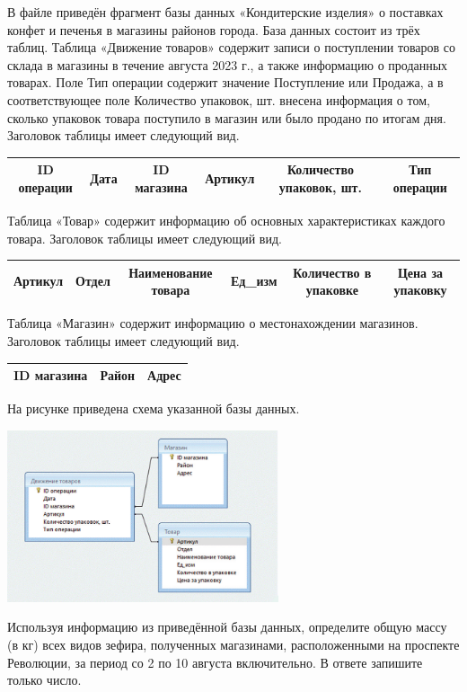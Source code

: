 \documentclass[14pt,a4paper]{article}
\begin{document}
В файле приведён фрагмент базы данных «Кондитерские изделия»
о поставках конфет и печенья в магазины районов города. База данных
состоит из трёх таблиц.
Таблица «Движение товаров» содержит записи о поступлении товаров
со склада в магазины в течение августа 2023 г., а также информацию
о проданных товарах. Поле Тип операции содержит значение Поступление
или Продажа, а в соответствующее поле Количество упаковок, шт. внесена
информация о том, сколько упаковок товара поступило в магазин или было
продано по итогам дня. Заголовок таблицы имеет следующий вид.

\begin{center}
    \begin{tabular}{|c|c|c|c|c|c|}
        \hline
        ID операции & Дата & ID магазина & Артикул & Количество упаковок, шт. & Тип операции \\
        \hline
    \end{tabular}
\end{center}

Таблица «Товар» содержит информацию об основных характеристиках
каждого товара. Заголовок таблицы имеет следующий вид.

\begin{center}
    \begin{tabular}{|c|c|c|c|c|c|}
        \hline
        Артикул & Отдел & Наименование товара & Ед\_изм & Количество в упаковке & Цена за упаковку \\
        \hline
    \end{tabular}
\end{center}

Таблица «Магазин» содержит информацию о местонахождении магазинов.
Заголовок таблицы имеет следующий вид.

\begin{center}
    \begin{tabular}{|c|c|c|}
        \hline
        ID магазина & Район & Адрес \\
        \hline
    \end{tabular}
\end{center}

На рисунке приведена схема указанной базы данных.

\begin{center}
    \includegraphics[width=0.6\textwidth]{table.png}
\end{center}

Используя информацию из приведённой базы данных, определите общую
массу (в кг) всех видов зефира, полученных магазинами, расположенными
на проспекте Революции, за период со 2 по 10 августа включительно.
В ответе запишите только число.
\end{document}

